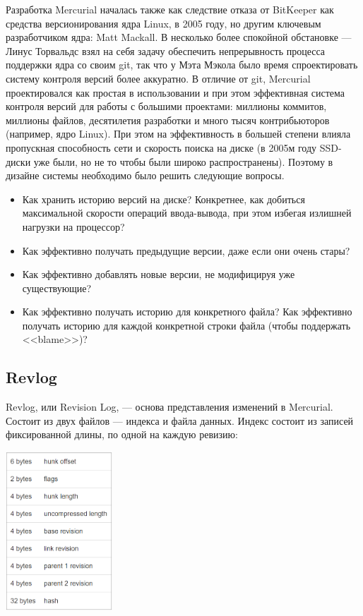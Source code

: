 \documentclass[a5paper]{article}
\begin{document}
Разработка Mercurial началась также как следствие отказа от BitKeeper как средства версионирования ядра Linux, в 2005 году, но другим ключевым разработчиком ядра: Matt Mackall. В несколько более спокойной обстановке --- Линус Торвальдс взял на себя задачу обеспечить непрерывность процесса поддержки ядра со своим git, так что у Мэта Мэкола было время спроектировать систему контроля версий более аккуратно. В отличие от git, Mercurial проектировался как простая в использовании и при этом эффективная система контроля версий для работы с большими проектами: миллионы коммитов, миллионы файлов, десятилетия разработки и много тысяч контрибьюторов (например, ядро Linux). При этом на эффективность в большей степени влияла пропускная способность сети и скорость поиска на диске (в 2005м году SSD-диски уже были, но не то чтобы были широко распространены). Поэтому в дизайне системы необходимо было решить следующие вопросы.

\begin{itemize}
    \item Как хранить историю версий на диске? Конкретнее, как добиться максимальной скорости операций ввода-вывода, при этом избегая излишней нагрузки на процессор?
    \item Как эффективно получать предыдущие версии, даже если они очень стары?
    \item Как эффективно добавлять новые версии, не модифицируя уже существующие?
    \item Как эффективно получать историю для конкретного файла? Как эффективно получать историю для каждой конкретной строки файла (чтобы поддержать <<blame>>)?
\end{itemize}

\subsection{Revlog}

Revlog, или Revision Log, --- основа представления изменений в Mercurial. Состоит из двух файлов --- индекса и файла данных. Индекс состоит из записей фиксированной длины, по одной на каждую ревизию:

\begin{center}
    \includegraphics[width=0.3\textwidth]{revlog.png}
\end{center}
\end{document}

